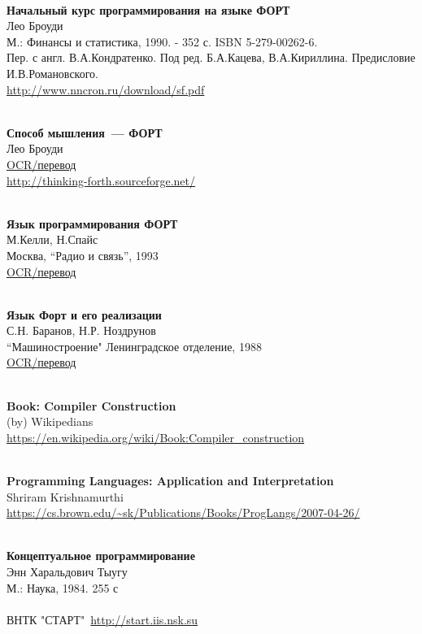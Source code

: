 \begin{thebibliography}{99}
\clearpage
{}\ \\
\textbf{Начальный курс программирования на языке ФОРТ}\\
Лео Броуди \\
М.: Финансы и статистика, 1990. - 352 с.  ISBN 5-279-00262-6.\\
Пер. с англ. В.А.Кондратенко. Под ред. Б.А.Кацева, В.А.Кириллина. Предисловие
И.В.Романовского.\\
\url{http://www.nncron.ru/download/sf.pdf}

\clearpage
{}\ \\
\textbf{Способ мышления\ --- ФОРТ}\\
Лео Броуди \\
\href{http://www.forth.org.ru/~cactus/files/brodie.rar}{OCR/перевод}\\
\url{http://thinking-forth.sourceforge.net/}

\clearpage
{}\ \\
\textbf{Язык программирования ФОРТ}\\
М.Келли, Н.Спайс\\
Москва, ``Радио и связь'', 1993\\
\href{http://www.forth.org.ru/~cactus/files/kelly.rar}{OCR/перевод}

\clearpage
{}\ \\
\textbf{Язык Форт и его реализации}\\
С.Н. Баранов, Н.Р. Ноздрунов\\
``Машиностроение" Ленинградское отделение, 1988\\
\href{http://www.forth.org.ru/~cactus/files/baranov2.rar}{OCR/перевод}

\clearpage
{}\ \\
\textbf{Book: Compiler Construction}\\
(by) Wikipedians\\
\url{https://en.wikipedia.org/wiki/Book:Compiler_construction}

\clearpage
{}\ \\
\textbf{Programming Languages: Application and Interpretation}\\
Shriram Krishnamurthi\\
\url{https://cs.brown.edu/~sk/Publications/Books/ProgLangs/2007-04-26/}

\clearpage
{}\ \\
\textbf{Концептуальное программирование}\\
Энн Харальдович Тыугу\\
М.: Наука, 1984. 255 с\\
\ \\
ВНТК "СТАРТ"\ \url{http://start.iis.nsk.su}


\end{thebibliography}
